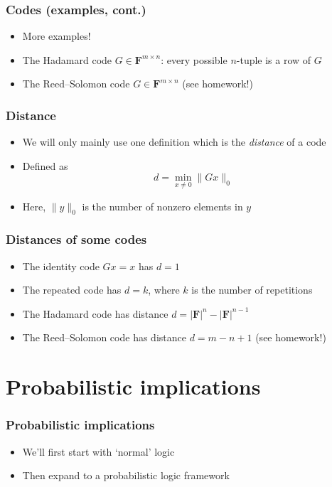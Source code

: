 \documentclass{beamer}
\newcommand{\field}{\mathbf{F}}
\begin{document}
    \begin{frame}
        \frametitle{Codes (examples, cont.)}
        \begin{itemize}\itemsep=12pt
            \item More examples!
            \pause
            \item The Hadamard code $G \in \field^{m\times n}$: every possible
                $n$-tuple is a row of $G$
            \pause
            \item The Reed--Solomon code $G \in \field^{m \times n}$ (see homework!)
        \end{itemize}
    \end{frame}

    \begin{frame}
        \frametitle{Distance}
        \begin{itemize}\itemsep=12pt
            \item We will only mainly use one definition which is
                the \emph{distance} of a code
            \item Defined as
            \[
                d = \min_{x \ne 0} \|Gx\|_0
            \]
            \item Here, $\|y\|_0$ is the number of nonzero elements in $y$
        \end{itemize}
    \end{frame}

    \begin{frame}
        \frametitle{Distances of some codes}
        \begin{itemize}\itemsep=12pt
            \item The identity code $Gx = x$ has $d = 1$
            \pause
            \item The repeated code has $d = k$, where $k$ is the number of repetitions
            \pause
            \item The Hadamard code has distance $d = |\field|^n - |\field|^{n-1}$
            \pause
            \item The Reed--Solomon code has distance $d = m - n + 1$ (see homework!)
        \end{itemize}
    \end{frame}

    \section{Probabilistic implications}
    \begin{frame}
        \frametitle{Probabilistic implications}
        \begin{itemize}\itemsep=12pt
            \item We'll first start with `normal' logic
            \item Then expand to a probabilistic logic framework
        \end{itemize}
    \end{frame}
\end{document}

